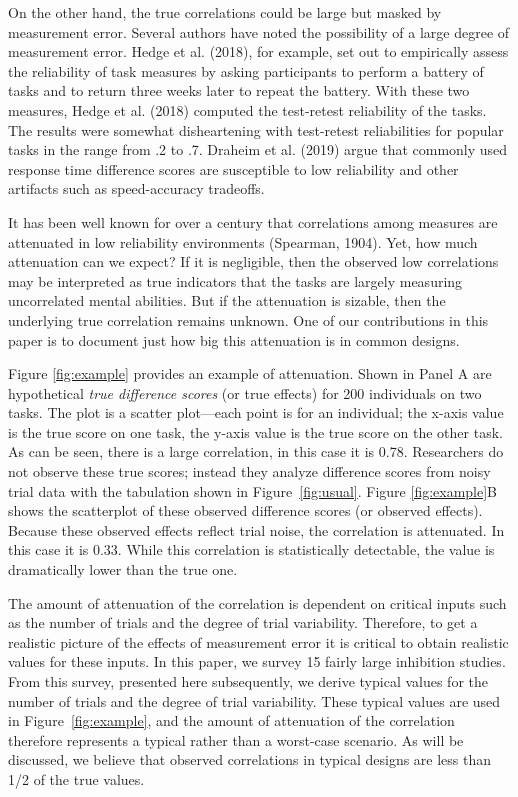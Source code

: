 \documentclass[
  ,man]{apa6}
\begin{document}
On the other hand, the true correlations could be large but masked by measurement error. Several authors have noted the possibility of a large degree of measurement error. Hedge et al. (2018), for example, set out to empirically assess the reliability of task measures by asking participants to perform a battery of tasks and to return three weeks later to repeat the battery. With these two measures, Hedge et al. (2018) computed the test-retest reliability of the tasks. The results were somewhat disheartening with test-retest reliabilities for popular tasks in the range from .2 to .7. Draheim et al. (2019) argue that commonly used response time difference scores are susceptible to low reliability and other artifacts such as speed-accuracy tradeoffs.

It has been well known for over a century that correlations among measures are attenuated in low reliability environments (Spearman, 1904). Yet, how much attenuation can we expect? If it is negligible, then the observed low correlations may be interpreted as true indicators that the tasks are largely measuring uncorrelated mental abilities. But if the attenuation is sizable, then the underlying true correlation remains unknown. One of our contributions in this paper is to document just how big this attenuation is in common designs.

Figure \ref{fig:example} provides an example of attenuation. Shown in Panel A are hypothetical \emph{true difference scores} (or true effects) for 200 individuals on two tasks. The plot is a scatter plot---each point is for an individual; the x-axis value is the true score on one task, the y-axis value is the true score on the other task. As can be seen, there is a large correlation, in this case it is 0.78.
Researchers do not observe these true scores; instead they analyze difference scores from noisy trial data with the tabulation shown in Figure~\ref{fig:usual}. Figure \ref{fig:example}B shows the scatterplot of these observed difference scores (or observed effects). Because these observed effects reflect trial noise, the correlation is attenuated. In this case it is 0.33. While this correlation is statistically detectable, the value is dramatically lower than the true one.

The amount of attenuation of the correlation is dependent on critical inputs such as the number of trials and the degree of trial variability. Therefore, to get a realistic picture of the effects of measurement error it is critical to obtain realistic values for these inputs. In this paper, we survey 15 fairly large inhibition studies. From this survey, presented here subsequently, we derive typical values for the number of trials and the degree of trial variability. These typical values are used in Figure~\ref{fig:example}, and the amount of attenuation of the correlation therefore represents a typical rather than a worst-case scenario. As will be discussed, we believe that observed correlations in typical designs are less than 1/2 of the true values.
\end{document}
